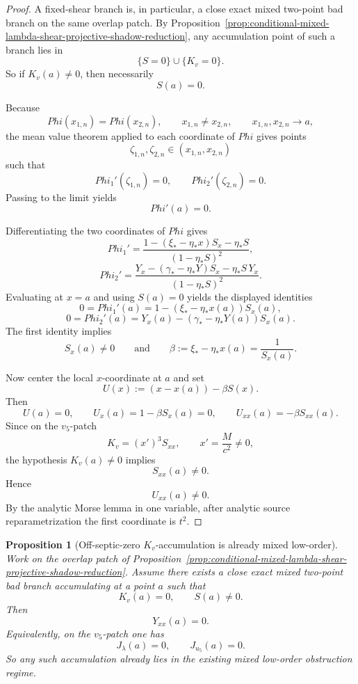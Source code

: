 \documentclass[11pt,a4paper]{amsart}
\def\Phi{Phi}%
\theoremstyle{plain}
\newtheorem{proposition}[theorem]{Proposition}
\theoremstyle{definition}
\begin{document}
\begin{proof}
A fixed-shear branch is, in particular, a close exact mixed two-point bad branch
on the same overlap patch. By
Proposition~\ref{prop:conditional-mixed-lambda-shear-projective-shadow-reduction},
any accumulation point of such a branch lies in
\[
\{S=0\}\cup\{K_v=0\}.
\]
So if $K_v(a)\neq 0$, then necessarily
\[
S(a)=0.
\]

Because
\[
\Phi(x_{1,n})=\Phi(x_{2,n}),
\qquad
x_{1,n}\neq x_{2,n},
\qquad
x_{1,n},x_{2,n}\to a,
\]
the mean value theorem applied to each coordinate of $\Phi$ gives points
\[
\zeta_{1,n},\zeta_{2,n}\in(x_{1,n},x_{2,n})
\]
such that
\[
\Phi_1'(\zeta_{1,n})=0,
\qquad
\Phi_2'(\zeta_{2,n})=0.
\]
Passing to the limit yields
\[
\Phi'(a)=0.
\]

Differentiating the two coordinates of $\Phi$ gives
\[
\Phi_1'
=
\frac{1-(\xi_*-\eta_* x)S_x-\eta_* S}{(1-\eta_* S)^2},
\]
\[
\Phi_2'
=
\frac{Y_x-(\gamma_*-\eta_* Y)S_x-\eta_* S\,Y_x}{(1-\eta_* S)^2}.
\]
Evaluating at $x=a$ and using $S(a)=0$ yields the displayed identities
\[
0=\Phi_1'(a)=1-(\xi_*-\eta_* x(a))S_x(a),
\]
\[
0=\Phi_2'(a)=Y_x(a)-(\gamma_*-\eta_* Y(a))S_x(a).
\]
The first identity implies
\[
S_x(a)\neq 0
\qquad\text{and}\qquad
\beta:=\xi_*-\eta_* x(a)=\frac{1}{S_x(a)}.
\]

Now center the local $x$-coordinate at $a$ and set
\[
U(x):=(x-x(a))-\beta S(x).
\]
Then
\[
U(a)=0,
\qquad
U_x(a)=1-\beta S_x(a)=0,
\qquad
U_{xx}(a)=-\beta S_{xx}(a).
\]
Since on the $v_5$-patch
\[
K_v=(x')^3S_{xx},
\qquad
x'=\frac{M}{c^2}\neq 0,
\]
the hypothesis $K_v(a)\neq 0$ implies
\[
S_{xx}(a)\neq 0.
\]
Hence
\[
U_{xx}(a)\neq 0.
\]
By the analytic Morse lemma in one variable, after analytic source
reparametrization the first coordinate is $t^2$.
\end{proof}

\begin{proposition}[Off-septic-zero $K_v$-accumulation is already mixed low-order]
\label{prop:off-septic-zero-Kv-accumulation-is-mixed-low-order}
Work on the overlap patch of
Proposition~\ref{prop:conditional-mixed-lambda-shear-projective-shadow-reduction}.
Assume there exists a close exact mixed two-point bad branch accumulating at a
point $a$ such that
\[
K_v(a)=0,
\qquad
S(a)\neq 0.
\]
Then
\[
Y_{xx}(a)=0.
\]
Equivalently, on the $v_5$-patch one has
\[
J_\lambda(a)=0,
\qquad
J_{u_5}(a)=0.
\]
So any such accumulation already lies in the existing mixed low-order
obstruction regime.
\end{proposition}
\end{document}

